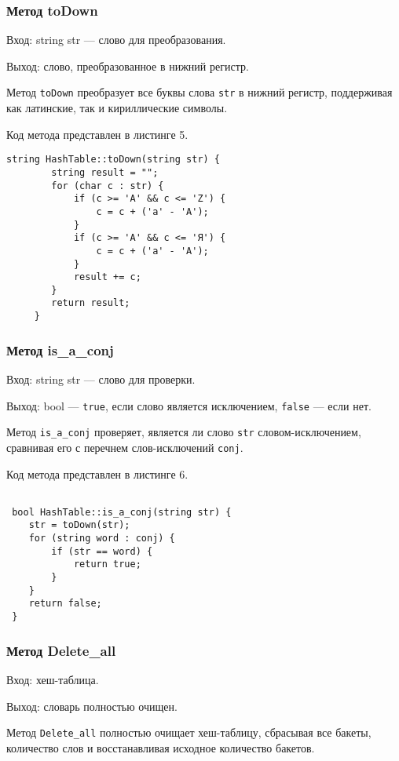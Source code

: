 \documentclass[10pt,a4paper,final]{article} %
\begin{document}
\subsubsection{Метод toDown}
Вход: string str — слово для преобразования. \par
Выход: слово, преобразованное в нижний регистр. \par
\par Метод \texttt{toDown} преобразует все буквы слова \texttt{str} в нижний регистр, поддерживая как латинские, так и кириллические символы.

Код метода представлен в листинге 5. \begin{lstlisting}[label=toDownMethod, caption = Метод toDown] 
	 string HashTable::toDown(string str) {
	 	string result = "";
	 	for (char c : str) {
	 		if (c >= 'A' && c <= 'Z') {
	 			c = c + ('a' - 'A');
	 		}
	 		if (c >= 'А' && c <= 'Я') {
	 			c = c + ('а' - 'А');
	 		}
	 		result += c;
	 	}
	 	return result;
	 }\end{lstlisting}
 
 
 \subsubsection{Метод is\_a\_conj}
 Вход: string str — слово для проверки. \par
 Выход: bool — \texttt{true}, если слово является исключением, \texttt{false} — если нет. \par
 \par Метод \texttt{is\_a\_conj} проверяет, является ли слово \texttt{str} словом-исключением, сравнивая его с перечнем слов-исключений \texttt{conj}.
 
 Код метода представлен в листинге 6. \begin{lstlisting}[label=isAConjMethod, caption = Метод is\_a\_conj] 
 
 bool HashTable::is_a_conj(string str) {
 	str = toDown(str);
 	for (string word : conj) {
 		if (str == word) {
 			return true;
 		}
 	}
 	return false;
 } \end{lstlisting}


\subsubsection{Метод Delete\_all}
Вход: хеш-таблица. \par
Выход: словарь полностью очищен. \par
\par Метод \texttt{Delete\_all} полностью очищает хеш-таблицу, сбрасывая все бакеты, количество слов и восстанавливая исходное количество бакетов.
\end{document}
